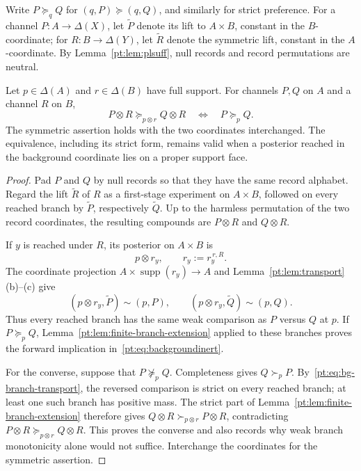 Write $P\succeq_qQ$ for $(q,P)\succeq(q,Q)$, and similarly for strict
preference.  For a channel $P:A\to\Delta(X)$, let $\widetilde P$ denote its
lift to $A\times B$, constant in the $B$-coordinate; for
$R:B\to\Delta(Y)$, let $\widetilde R$ denote the symmetric lift, constant in
the $A$-coordinate.
By Lemma~\ref{pt:lem:plsuff}, null records and record permutations are neutral.

\begin{lemma}
\label{pt:lem:background}
Let $p\in\Delta(A)$ and $r\in\Delta(B)$ have full support.  For channels
$P,Q$ on $A$ and a channel $R$ on $B$,
\begin{equation}
 P\otimes R\succeq_{p\otimes r}Q\otimes R
 \quad\Longleftrightarrow\quad
 P\succeq_p Q.
\tag{BI}\label{pt:eq:backgroundinert}
\end{equation}
The symmetric assertion holds with the two coordinates interchanged.  The
equivalence, including its strict form, remains valid when a posterior reached
in the background coordinate lies on a proper support face.
\end{lemma}

\begin{proof}
Pad $P$ and $Q$ by null records so that they have the same record alphabet.
Regard the lift $\widetilde R$ of $R$ as a first-stage experiment on
$A\times B$, followed on every reached branch by $\widetilde P$, respectively
$\widetilde Q$.  Up to the harmless permutation of the two record
coordinates, the resulting compounds are $P\otimes R$ and $Q\otimes R$.

If $y$ is reached under $R$, its posterior on $A\times B$ is
\[
 p\otimes r_y,
 \qquad r_y:=r_y^{\,r,R}.
\]
The coordinate projection $A\times\operatorname{supp}(r_y)\to A$ and
Lemma~\ref{pt:lem:transport}\textup{(b)--(c)} give
\[
 (p\otimes r_y,\widetilde P)\sim(p,P),
 \qquad
 (p\otimes r_y,\widetilde Q)\sim(p,Q).
\tag{BI$'$}\label{pt:eq:bg-branch-transport}
\]
Thus every reached branch has the same weak comparison as $P$ versus $Q$ at
$p$.  If $P\succeq_pQ$, Lemma~\ref{pt:lem:finite-branch-extension} applied to
these branches proves the forward implication in~\eqref{pt:eq:backgroundinert}.

For the converse, suppose that $P\not\succeq_pQ$.  Completeness gives
$Q\succ_pP$.  By~\eqref{pt:eq:bg-branch-transport}, the reversed comparison is
strict on every reached branch; at least one such branch has positive mass.
The strict part of Lemma~\ref{pt:lem:finite-branch-extension} therefore gives
$Q\otimes R\succ_{p\otimes r}P\otimes R$, contradicting
$P\otimes R\succeq_{p\otimes r}Q\otimes R$.  This proves the converse and
also records why weak branch monotonicity alone would not suffice.  Interchange
the coordinates for the symmetric assertion.
\end{proof}

